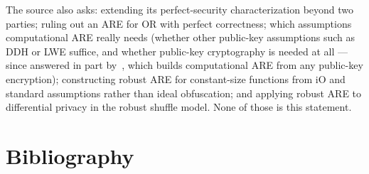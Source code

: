 \documentclass{conjura-conjecture}
\begin{document}
\begin{remark}
The source also asks: extending its perfect-security characterization
beyond two parties; ruling out an ARE for OR with perfect correctness;
which assumptions computational ARE really needs (whether other
public-key assumptions such as DDH or LWE suffice, and whether public-key
cryptography is needed at all --- since answered in part
by~\cite{BEG25}, which builds computational ARE from any public-key
encryption); constructing robust ARE for constant-size functions from iO
and standard assumptions rather than ideal obfuscation; and applying
robust ARE to differential privacy in the robust shuffle model. None of
those is this statement.
\end{remark}

\section{Bibliography}
\end{document}
